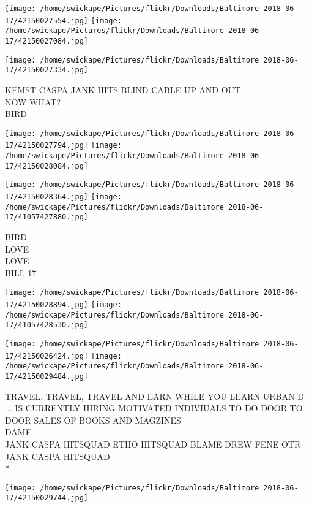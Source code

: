 \documentclass[10pt,letterpaper]{article}
\begin{document}
\texttt{[image: /home/swickape/Pictures/flickr/Downloads/Baltimore 2018-06-17/42150027554.jpg]}
\texttt{[image: /home/swickape/Pictures/flickr/Downloads/Baltimore 2018-06-17/42150027084.jpg]}

\vspace{0.25in}
\texttt{[image: /home/swickape/Pictures/flickr/Downloads/Baltimore 2018-06-17/42150027334.jpg]}

KEMST CASPA JANK HITS BLIND CABLE UP AND OUT\\
NOW WHAT?\\
BIRD\\
\pagebreak

\texttt{[image: /home/swickape/Pictures/flickr/Downloads/Baltimore 2018-06-17/42150027794.jpg]}
\texttt{[image: /home/swickape/Pictures/flickr/Downloads/Baltimore 2018-06-17/42150028084.jpg]}

\texttt{[image: /home/swickape/Pictures/flickr/Downloads/Baltimore 2018-06-17/42150028364.jpg]}
\texttt{[image: /home/swickape/Pictures/flickr/Downloads/Baltimore 2018-06-17/41057427880.jpg]}

BIRD\\
LOVE\\
LOVE\\
BILL 17\\
\pagebreak

\texttt{[image: /home/swickape/Pictures/flickr/Downloads/Baltimore 2018-06-17/42150028894.jpg]}
\texttt{[image: /home/swickape/Pictures/flickr/Downloads/Baltimore 2018-06-17/41057428530.jpg]}

\texttt{[image: /home/swickape/Pictures/flickr/Downloads/Baltimore 2018-06-17/42150026424.jpg]}
\texttt{[image: /home/swickape/Pictures/flickr/Downloads/Baltimore 2018-06-17/42150029484.jpg]}

TRAVEL, TRAVEL, TRAVEL AND EARN WHILE YOU LEARN URBAN D ... IS CURRENTLY HIRING MOTIVATED INDIVIUALS TO DO DOOR TO DOOR SALES OF BOOKS AND MAGZINES\\
DAME\\
JANK CASPA HITSQUAD ETHO HITSQUAD BLAME DREW FENE OTR JANK CASPA HITSQUAD\\
*\\
\pagebreak

\texttt{[image: /home/swickape/Pictures/flickr/Downloads/Baltimore 2018-06-17/42150029744.jpg]}
\end{document}
